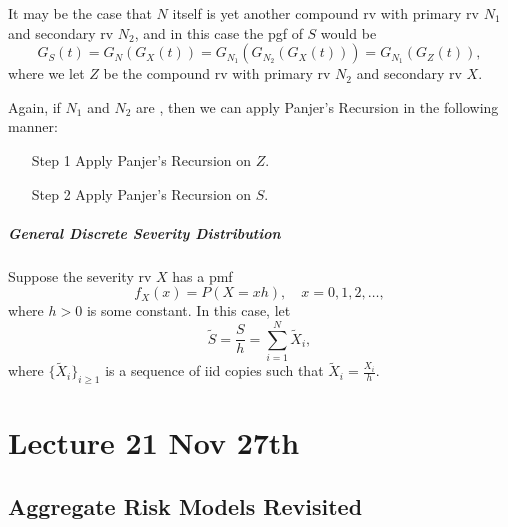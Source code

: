 \documentclass[notoc,notitlepage]{tufte-book}
\begin{document}
It may be the case that $N$ itself is yet another compound rv with primary rv $N_1$ and secondary rv $N_2$, and in this case the pgf of $S$ would be
\begin{equation*}
  G_S(t) = G_N( G_X(t) ) = G_{N_1}( G_{N_2}( G_X(t) ) ) = G_{N_1}(G_Z(t)),
\end{equation*}
where we let $Z$ be the compound rv with primary rv $N_2$ and secondary rv $X$.

Again, if $N_1$ and $N_2$ are , then we can apply Panjer's Recursion in the following manner:
\begin{itemize}
  \item[Step 1] Apply Panjer's Recursion on $Z$.
  \item[Step 2] Apply Panjer's Recursion on $S$.
\end{itemize}

\paragraph{General Discrete Severity Distribution} Suppose the severity rv $X$ has a pmf 
\begin{equation*}
  f_X(x) = P(X = xh), \quad x = 0, 1, 2, \ldots,
\end{equation*}
where $h > 0$ is some constant. In this case, let
\begin{equation*}
  \tilde{S} = \frac{S}{h} = \sum_{i=1}^{N} \tilde{X}_i,
\end{equation*}
where $\{\tilde{X}_i\}_{i \geq 1}$ is a sequence of iid copies such that $\tilde{X}_i = \frac{X_i}{h}$.




\chapter{Lecture 21 Nov 27th}%
\label{chp:lecture_21_nov_27th}

\section{Aggregate Risk Models Revisited}%
\label{sec:aggregate_risk_models_revisited}
\end{document}
